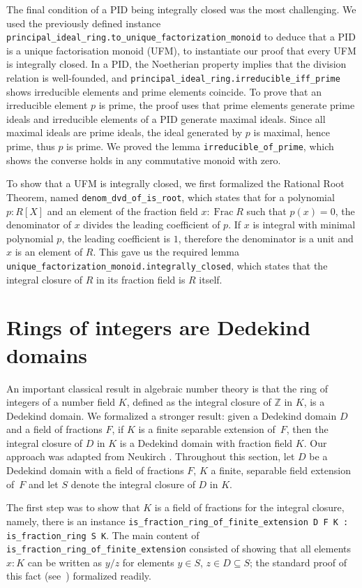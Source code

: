 \documentclass[sn-mathphys]{sn-jnl}%
\newcommand{\lean}[1]{\texttt{#1}\xspace}
\renewcommand{\Z}{\mathbb{Z}}
\DeclareMathOperator{\Frac}{Frac}
\begin{document}
The final condition of a PID being integrally closed was the most challenging.
We used the previously defined instance \lean{principal\_ideal\_ring.to\-\_unique\-\_factorization\_monoid} to deduce that a PID is a unique factorisation monoid (UFM),
to instantiate our proof that every UFM is integrally closed.
In a PID, the Noetherian property implies that the division relation is well-founded,
and \lean{principal\_ideal\_ring.irreducible\_iff\_prime} shows irreducible elements and prime elements coincide.
To prove that an irreducible element $p$ is prime, the proof uses that prime elements generate prime ideals and irreducible elements of a PID generate maximal ideals. Since all maximal ideals are prime ideals, the ideal generated by $p$ is maximal, hence prime, thus $p$ is prime.
We proved the lemma \lean{irreducible\_of\_prime}, which shows the converse holds in any commutative monoid with zero.

To show that a UFM is integrally closed, we first formalized the Rational Root Theorem, named \lean{denom\_dvd\_of\_is\_root},
which states that for a polynomial $p : R[X]$ and an element of the fraction field $x : \Frac R$ such that $p(x) = 0$, the denominator of $x$ divides the leading coefficient of $p$.
If $x$ is integral with minimal polynomial $p$, the leading coefficient is $1$, therefore the denominator is a unit and $x$ is an element of $R$.
This gave us the required lemma \lean{unique\_factorization\_monoid.integrally\_closed}, which states that the integral closure of $R$ in its fraction field is $R$ itself.

\section{Rings of integers are Dedekind domains} \label{sec:integral-closure}

An important classical result in algebraic number theory is that the ring of integers of a number field $K$, defined as the integral closure of $\Z$ in $K$, is a Dedekind domain. We formalized a stronger result: given a Dedekind domain $D$ and a field of fractions $F$, if $K$ is a finite separable extension of~$F$, then the integral closure of $D$ in $K$ is a Dedekind domain with fraction field $K$.
Our approach was adapted from Neukirch \cite[Theorem~3.1]{Neukirch}.
Throughout this section, let $D$ be a Dedekind domain with a field of fractions $F$, $K$ a finite, separable field extension of~$F$ and let $S$ denote the integral closure of $D$ in $K$.

The first step was to show that $K$ is a field of fractions for the integral closure, namely, there is an instance \lean{is\_fraction\_ring\_of\_finite\_extension D F K : is\_fraction\_ring S K}.
The main content of \lean{is\_fraction\_ring\_\-of\-\_finite\-\_extension} consisted of showing that all elements $x : K$ can be written as $y / z$ for elements $y \in S$, $z \in D \subseteq S$;
the standard proof of this fact (see~\cite[Theorem~15.29]{Dummit-and-Foote}) formalized readily.
\end{document}
